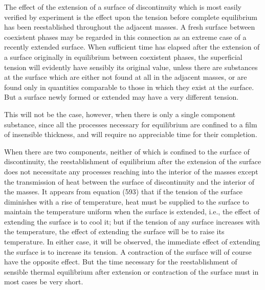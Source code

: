\documentclass[12pt]{memoir}
\begin{document}
{The effect of the extension of a surface of discontinuity which is most easily verified by experiment is the effect upon the tension before complete equilibrium has been reestablished throughout the adjacent masses. A fresh surface between coexistent phases may be regarded in this connection as an extreme case of a recently extended surface. When sufficient time has elapsed after the extension of a surface originally in equilibrium between coexistent phases, the superficial tension will evidently have sensibly its original value, unless there are substances at the surface which are either not found at all in the adjacent masses, or are found only in quantities comparable to those in which they exist at the surface. But a surface newly formed or extended may have a very different tension.

This will not be the case, however, when there is only a single component substance, since all the processes necessary for equilibrium are confined to a film of insensible thickness, and will require no appreciable time for their completion.

When there are two components, neither of which is confined to the surface of discontinuity, the reestablishment of equilibrium after the extension of the surface does not necessitate any processes reaching into the interior of the masses except the transmission of heat between the surface of discontinuity and the interior of the masses. It appears from equation (593) that if the tension of the surface diminishes with a rise of temperature, heat must be supplied to the surface to maintain the temperature uniform when the surface is extended, i.e., the effect of extending the surface is to cool it; but if the tension of any surface increases with the temperature, the effect of extending the surface will be to raise its temperature. In either case, it will be observed, the immediate effect of extending the surface is to increase its tension. A contraction of the surface will of course have the opposite effect.  But the time necessary for the reestablishment of sensible thermal equilibrium after extension or contraction of the surface must in most cases be very short.

}
\end{document}
